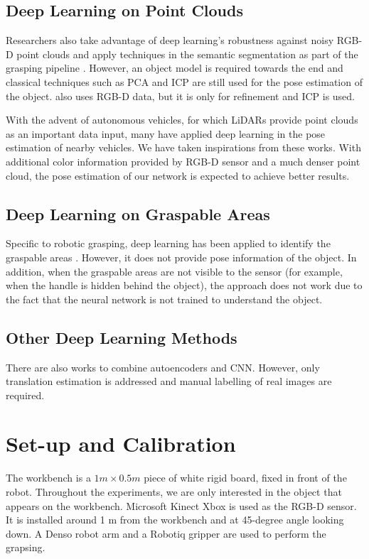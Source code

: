 \documentclass[conference]{IEEEtran}
\begin{document}
\subsection{Deep Learning on Point Clouds}
Researchers also take advantage of deep learning's robustness against noisy RGB-D point clouds and apply techniques in the semantic segmentation as part of the grasping pipeline \cite{mahler_2016_iros}\cite{zeng_2017_icra}\cite{wong_2017_iros}. However, an object model is required towards the end and classical techniques such as PCA and ICP are still used for the pose estimation of the object. \cite{xiang_2018_rss} also uses RGB-D data, but it is only for refinement and ICP is used.

With the advent of autonomous vehicles, for which LiDARs provide point clouds as an important data input, many have applied deep learning in the pose estimation of nearby vehicles. \cite{chen_2017_cvpr} We have taken inspirations from these works. With additional color information provided by RGB-D sensor and a much denser point cloud, the pose estimation of our network is expected to achieve better results.

\subsection{Deep Learning on Graspable Areas}
Specific to robotic grasping, deep learning has been applied to identify the graspable areas \cite{saxena_2008_ijrr}. However, it does not provide pose information of the object. In addition, when the graspable areas are not visible to the sensor (for example, when the handle is hidden behind the object), the approach does not work due to the fact that the neural network is not trained to understand the object.

\subsection{Other Deep Learning Methods}
There are also works to combine autoencoders and CNN\cite{inoue_2018_icip}. However, only translation estimation is addressed and manual labelling of real images are required.


\section{Set-up and Calibration}
The workbench is a $1 m\times0.5 m$ piece of white rigid board, fixed in front of the robot. Throughout the experiments, we are only interested in the object that appears on the workbench. Microsoft Kinect Xbox is used as the RGB-D sensor. It is installed around 1 m from the workbench and at 45-degree angle looking down. A Denso robot arm and a Robotiq gripper are used to perform the grapsing.
\end{document}
